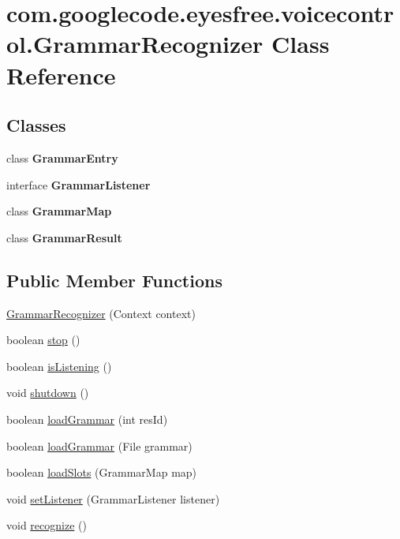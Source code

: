 \hypertarget{classcom_1_1googlecode_1_1eyesfree_1_1voicecontrol_1_1_grammar_recognizer}{\section{com.\-googlecode.\-eyesfree.\-voicecontrol.\-Grammar\-Recognizer Class Reference}
\label{classcom_1_1googlecode_1_1eyesfree_1_1voicecontrol_1_1_grammar_recognizer}
}
\subsection*{Classes}
\begin{DoxyCompactItemize}
\item 
class {\bfseries Grammar\-Entry}
\item 
interface {\bfseries Grammar\-Listener}
\item 
class {\bfseries Grammar\-Map}
\item 
class {\bfseries Grammar\-Result}
\end{DoxyCompactItemize}
\subsection*{Public Member Functions}
\begin{DoxyCompactItemize}
\item 
\hyperlink{classcom_1_1googlecode_1_1eyesfree_1_1voicecontrol_1_1_grammar_recognizer_a335c7243c8a188f63506398a72da9780}{Grammar\-Recognizer} (Context context)
\item 
boolean \hyperlink{classcom_1_1googlecode_1_1eyesfree_1_1voicecontrol_1_1_grammar_recognizer_a1fd47a5511fa2b7c51eb1b76735a6a62}{stop} ()
\item 
boolean \hyperlink{classcom_1_1googlecode_1_1eyesfree_1_1voicecontrol_1_1_grammar_recognizer_a6f4b750113a3d134d5f158b497442bdb}{is\-Listening} ()
\item 
void \hyperlink{classcom_1_1googlecode_1_1eyesfree_1_1voicecontrol_1_1_grammar_recognizer_ac5492e0db70e3a156d4d250c848379c0}{shutdown} ()
\item 
boolean \hyperlink{classcom_1_1googlecode_1_1eyesfree_1_1voicecontrol_1_1_grammar_recognizer_ad5da5df6c78f8df6a143302321390e90}{load\-Grammar} (int res\-Id)
\item 
boolean \hyperlink{classcom_1_1googlecode_1_1eyesfree_1_1voicecontrol_1_1_grammar_recognizer_a17ff647f279370b758a44ac4f0ab9236}{load\-Grammar} (File grammar)
\item 
boolean \hyperlink{classcom_1_1googlecode_1_1eyesfree_1_1voicecontrol_1_1_grammar_recognizer_a56af40935d33b65924d61bc4078647b6}{load\-Slots} (Grammar\-Map map)
\item 
void \hyperlink{classcom_1_1googlecode_1_1eyesfree_1_1voicecontrol_1_1_grammar_recognizer_ac2c2dc188ed0f5a3f0a43e52b28e0fc6}{set\-Listener} (Grammar\-Listener listener)
\item 
void \hyperlink{classcom_1_1googlecode_1_1eyesfree_1_1voicecontrol_1_1_grammar_recognizer_a8592712e3b3203a0d6dda85ef5a9ec8b}{recognize} ()
\end{DoxyCompactItemize}
